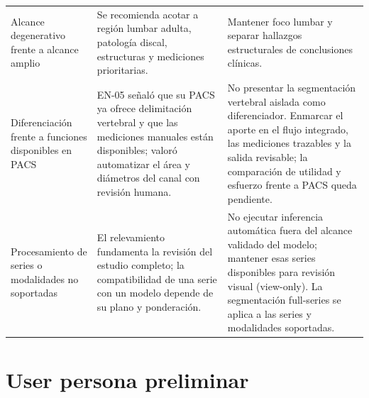 {\begin{longtable}{>{\raggedright\arraybackslash}p{} >{\raggedright\arraybackslash}p{} >{\raggedright\arraybackslash}p{}}
Alcance degenerativo frente a alcance amplio & Se recomienda acotar a región lumbar adulta, patología discal, estructuras y mediciones prioritarias. & Mantener foco lumbar y separar hallazgos estructurales de conclusiones clínicas. \\
Diferenciación frente a funciones disponibles en PACS & EN-05 señaló que su PACS ya ofrece delimitación vertebral y que las mediciones manuales están disponibles; valoró automatizar el área y diámetros del canal con revisión humana. & No presentar la segmentación vertebral aislada como diferenciador. Enmarcar el aporte en el flujo integrado, las mediciones trazables y la salida revisable; la comparación de utilidad y esfuerzo frente a PACS queda pendiente. \\
Procesamiento de series o modalidades no soportadas & El relevamiento fundamenta la revisión del estudio completo; la compatibilidad de una serie con un modelo depende de su plano y ponderación. & No ejecutar inferencia automática fuera del alcance validado del modelo; mantener esas series disponibles para revisión visual (view-only). La segmentación full-series se aplica a las series y modalidades soportadas. \\
\hline
\end{longtable}
}

\section{User persona preliminar}

